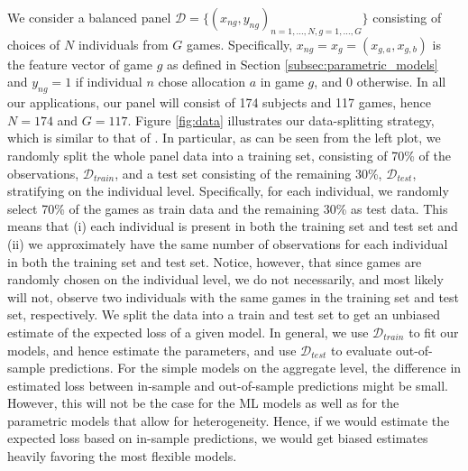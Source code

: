 \documentclass[11pt,a4paper]{article}
\theoremstyle{definition}
\begin{document}
We consider a balanced panel $\mathcal{D}=\{(x_{ng},y_{ng})_{n=1,\dots,N,g=1,\dots,G}\}$ consisting of choices of $N$ individuals from $G$ games. Specifically, $x_{ng}=x_g = (x_{g,a},x_{g,b})$ is the feature vector of game $g$ as defined in Section \ref{subsec:parametric_models} and $y_{ng}=1$ if individual $n$ chose allocation $a$ in game $g$, and 0 otherwise. In all our applications, our panel will consist of 174 subjects and 117 games, hence $N=174$ and $G=117$. Figure \ref{fig:data} illustrates our data-splitting strategy, which is similar to that of \cite{Peysakhovich2017}. In particular,  as can be seen from the left plot, we randomly split the whole panel data into a training set, consisting of 70\% of the observations,  $\mathcal{D}_{train}$, and a test set consisting of the remaining 30\%, $\mathcal{D}_{test}$, stratifying on the individual level. Specifically, for each individual, we randomly select 70\% of the games as train data and the remaining 30\% as test data. This means that (i) each individual is present in both the training set and test set and (ii) we approximately have the same number of observations for each individual in both the training set and test set. Notice, however, that since games are randomly chosen on the individual level, we do not necessarily, and most likely will not, observe two individuals with the same games in the training set and test set, respectively. We split the data into a train and test set to get an unbiased estimate of the expected loss of a given model. In general, we use $\mathcal{D}_{train}$ to fit our models, and hence estimate the parameters, and use $\mathcal{D}_{test}$ to evaluate out-of-sample predictions. For the simple models on the aggregate level, the difference in estimated loss between in-sample and out-of-sample predictions might be small. However, this will not be the case for the ML models as well as for the parametric models that allow for heterogeneity. Hence, if we would estimate the expected loss based on in-sample predictions, we would get biased estimates heavily favoring the most flexible models.
\end{document}
